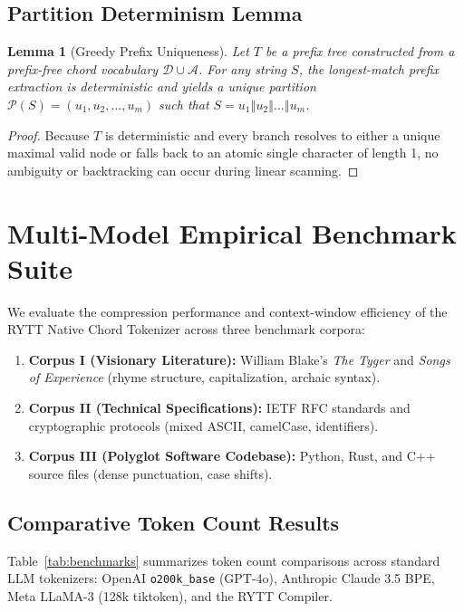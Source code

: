 \documentclass[11pt,oneside,letterpaper]{article}
\theoremstyle{sovereignstyle}
\newtheorem{lemma}[theorem]{Lemma}
\begin{document}
\subsection{Partition Determinism Lemma}
\begin{lemma}[Greedy Prefix Uniqueness]
Let $T$ be a prefix tree constructed from a prefix-free chord vocabulary $\mathcal{D} \cup \mathcal{A}$. For any string $S$, the longest-match prefix extraction is deterministic and yields a unique partition $\mathcal{P}(S) = (u_1, u_2, \dots, u_m)$ such that $S = u_1 \mathbin{\Vert} u_2 \mathbin{\Vert} \dots \mathbin{\Vert} u_m$.
\end{lemma}
\begin{proof}
Because $T$ is deterministic and every branch resolves to either a unique maximal valid node or falls back to an atomic single character of length 1, no ambiguity or backtracking can occur during linear scanning.
\end{proof}

\section{Multi-Model Empirical Benchmark Suite}

We evaluate the compression performance and context-window efficiency of the RYTT Native Chord Tokenizer across three benchmark corpora:
\begin{enumerate}
  \item \textbf{Corpus I (Visionary Literature):} William Blake's \textit{The Tyger} and \textit{Songs of Experience} (rhyme structure, capitalization, archaic syntax).
  \item \textbf{Corpus II (Technical Specifications):} IETF RFC standards and cryptographic protocols (mixed ASCII, camelCase, identifiers).
  \item \textbf{Corpus III (Polyglot Software Codebase):} Python, Rust, and C++ source files (dense punctuation, case shifts).
\end{enumerate}

\subsection{Comparative Token Count Results}
Table~\ref{tab:benchmarks} summarizes token count comparisons across standard LLM tokenizers: OpenAI \texttt{o200k\_base} (GPT-4o), Anthropic Claude 3.5 BPE, Meta LLaMA-3 (128k tiktoken), and the RYTT Compiler.
\end{document}
